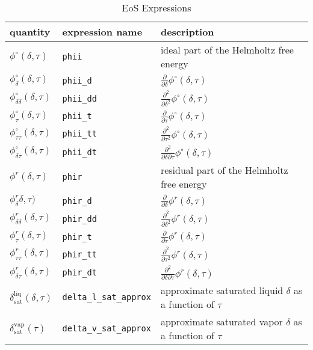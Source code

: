 \documentclass[oneside]{book}
\begin{document}
\begin{table}[h!]
\centering
\caption{EoS Expressions}
\begin{tabular}{ l l l }
\hline
quantity & expression name & description \\
\hline
\hline
$\phi^\circ(\delta, \tau)$ &  \texttt{phii} & ideal part of the Helmholtz free energy \\[1ex]  
$\phi_\delta^\circ(\delta, \tau)$ & \texttt{phii\_d} & $\frac{\partial}{\partial \delta} \phi^\circ(\delta, \tau) $ \\[1ex] 
$\phi_{\delta\delta}^\circ(\delta, \tau)$ & \texttt{phii\_dd} & $\frac{\partial^2}{\partial \delta^2} \phi^\circ(\delta, \tau) $ \\[1ex] 
$\phi_\tau^\circ(\delta, \tau)$ & \texttt{phii\_t} & $\frac{\partial}{\partial \tau} \phi^\circ(\delta, \tau) $ \\[1ex] 
$\phi_{\tau\tau}^\circ(\delta, \tau)$ & \texttt{phii\_tt} & $\frac{\partial^2}{\partial \tau^2} \phi^\circ(\delta, \tau) $ \\[1ex]
$\phi_{\delta\tau}^\circ(\delta, \tau)$ & \texttt{phii\_dt} & $\frac{\partial^2}{\partial \delta \partial \tau} \phi^\circ(\delta, \tau) $ \\[1ex]
$\phi^r(\delta, \tau)$ &  \texttt{phir} & residual part of the Helmholtz free energy \\[1ex]  
$\phi_\delta^r\delta, \tau)$ & \texttt{phir\_d} & $\frac{\partial}{\partial \delta} \phi^r(\delta, \tau) $ \\[1ex] 
$\phi_{\delta\delta}^r(\delta, \tau)$ & \texttt{phir\_dd} & $\frac{\partial^2}{\partial \delta^2} \phi^r(\delta, \tau) $ \\[1ex] 
$\phi_\tau^r(\delta, \tau)$ & \texttt{phir\_t} & $\frac{\partial}{\partial \tau} \phi^r(\delta, \tau) $ \\[1ex] 
$\phi_{\tau\tau}^r(\delta, \tau)$ & \texttt{phir\_tt} & $\frac{\partial^2}{\partial \tau^2} \phi^r(\delta, \tau) $ \\[1ex]
$\phi_{\delta\tau}^r(\delta, \tau)$ & \texttt{phir\_dt} & $\frac{\partial^2}{\partial \delta \partial \tau} \phi^r(\delta, \tau) $ \\[1ex]
$\delta^\text{liq}_\text{sat}(\delta, \tau)$ & \texttt{delta\_l\_sat\_approx} & approximate saturated liquid $\delta$ as a function of $\tau$  \\[1ex]
$\delta_{\text{sat}}^{\text{vap}}(\tau)$ & \texttt{delta\_v\_sat\_approx} & approximate saturated vapor $\delta$ as a function of $\tau$  \\[1ex]
 \hline    
\end{tabular}
\label{table:eos_expressions}
\end{table}
\end{document}
